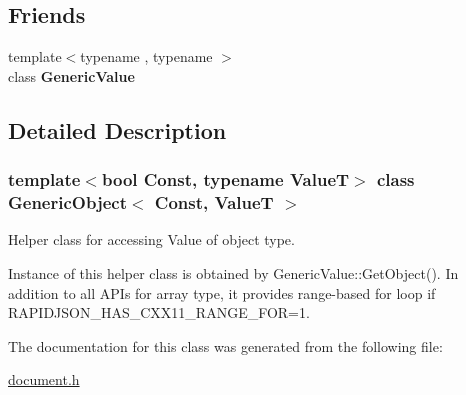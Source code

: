 \subsection*{Friends}
\begin{DoxyCompactItemize}
\item 
\mbox{\label{a02080_a899449e1a645b5e377af059fb61113d8}} 
{\footnotesize template$<$typename , typename $>$ }\\class {\bfseries Generic\+Value}
\end{DoxyCompactItemize}


\subsection{Detailed Description}
\subsubsection*{template$<$bool Const, typename ValueT$>$\newline
class Generic\+Object$<$ Const, Value\+T $>$}

Helper class for accessing Value of object type. 

Instance of this helper class is obtained by {\ttfamily Generic\+Value\+::\+Get\+Object()}. In addition to all A\+P\+Is for array type, it provides range-\/based for loop if {\ttfamily R\+A\+P\+I\+D\+J\+S\+O\+N\+\_\+\+H\+A\+S\+\_\+\+C\+X\+X11\+\_\+\+R\+A\+N\+G\+E\+\_\+\+F\+OR=1}. 

The documentation for this class was generated from the following file\+:\begin{DoxyCompactItemize}
\item 
\hyperlink{a00476}{document.\+h}\end{DoxyCompactItemize}
